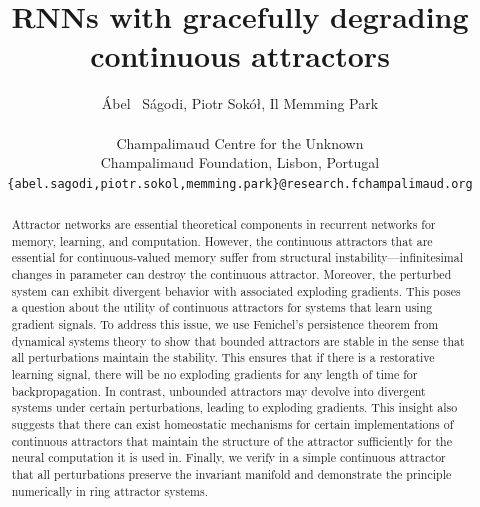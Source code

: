 \documentclass{article}
\title{RNNs with gracefully degrading continuous attractors}
\author{%
    \'Abel ~S\'agodi, Piotr Sok\'o\l, Il Memming Park \\
    \\
    Champalimaud Centre for the Unknown\\
    Champalimaud Foundation, Lisbon, Portugal\\
    \texttt{\{abel.sagodi,piotr.sokol,memming.park\}@research.fchampalimaud.org} \\
}
\newcounter{ct}
\theoremstyle{definition}
\theoremstyle{remark}
\begin{document}
    


\maketitle

\begin{abstract}
Attractor networks are essential theoretical components in recurrent networks for memory, learning, and computation.
However, the continuous attractors that are essential for continuous-valued memory suffer from structural instability---infinitesimal changes in parameter can destroy the continuous attractor.
Moreover, the perturbed system can exhibit divergent behavior with associated exploding gradients.
This poses a question about the utility of continuous attractors for systems that learn using gradient signals.
To address this issue, we use Fenichel's persistence theorem from dynamical systems theory to show that bounded attractors are stable in the sense that all perturbations maintain the stability.
This ensures that if there is a restorative learning signal, there will be no exploding gradients for any length of time for backpropagation.
In contrast, unbounded attractors may devolve into divergent systems under certain perturbations, leading to exploding gradients.
This insight also suggests that there can exist homeostatic mechanisms for certain implementations of continuous attractors that maintain the structure of the attractor sufficiently for the neural computation it is used in.
Finally, we verify in a simple continuous attractor that all perturbations preserve the invariant manifold and demonstrate the principle numerically in ring attractor systems.
\end{abstract}


%
\end{document}

